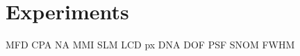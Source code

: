 \chapter{Experiments}
\label{ch:experiments}

\gls{MFD}
\gls{CPA}
\gls{NA}
\gls{MMI}
\gls{SLM}
\gls{LCD}
\gls{px}
\gls{DNA}
\gls{DOF}
\gls{PSF}
\gls{SNOM}
\gls{FWHM}

